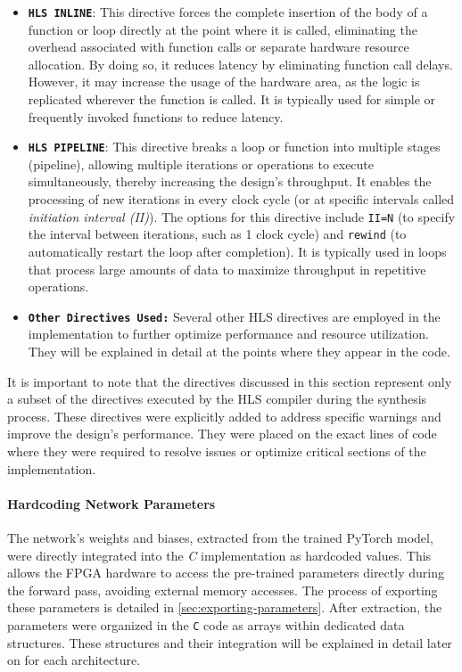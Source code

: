 \documentclass{article}
\begin{document}
\begin{itemize}
    \item \textbf{\texttt{HLS INLINE}}: This directive forces the complete insertion of the body of a function or loop directly at the point where it is called, eliminating the overhead associated with function calls or separate hardware resource allocation. By doing so, it reduces latency by eliminating function call delays. However, it may increase the usage of the hardware area, as the logic is replicated wherever the function is called. It is typically used for simple or frequently invoked functions to reduce latency.
    
    \item \textbf{\texttt{HLS PIPELINE}}: This directive breaks a loop or function into multiple stages (pipeline), allowing multiple iterations or operations to execute simultaneously, thereby increasing the design's throughput. It enables the processing of new iterations in every clock cycle (or at specific intervals called \textit{ initiation interval (II)}). The options for this directive include \texttt{II=N} (to specify the interval between iterations, such as 1 clock cycle) and \texttt{rewind} (to automatically restart the loop after completion). It is typically used in loops that process large amounts of data to maximize throughput in repetitive operations.

    \item \textbf{\texttt{Other Directives Used:}} Several other HLS directives are employed in the implementation to further optimize performance and resource utilization. They will be explained in detail at the points where they appear in the code.

\end{itemize}

It is important to note that the directives discussed in this section represent only a subset of the directives executed by the HLS compiler during the synthesis process. These directives were explicitly added to address specific warnings and improve the design's performance. They were placed on the exact lines of code where they were required to resolve issues or optimize critical sections of the implementation.


\paragraph{Hardcoding Network Parameters}
The network's weights and biases, extracted from the trained PyTorch model, were directly integrated into the \textit{C} implementation as hardcoded values. This allows the FPGA hardware to access the pre-trained parameters directly during the forward pass, avoiding external memory accesses. The process of exporting these parameters is detailed in \ref{sec:exporting-parameters}. After extraction, the parameters were organized in the \texttt{C} code as arrays within dedicated data structures. These structures and their integration will be explained in detail later on for each architecture.
\end{document}
